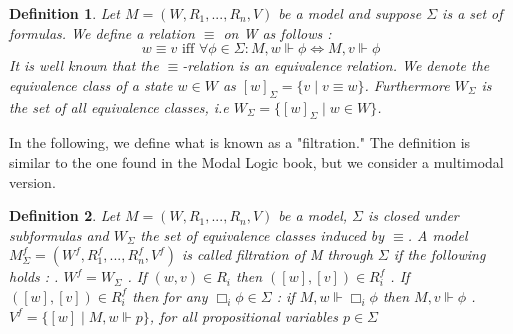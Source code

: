 \documentclass[12pt, a4paper]{scrartcl}
\newtheorem{definition}{Definition}[subsection]
\begin{document}
\begin{definition}
    Let $M = (W,R_1,...,R_n,V)$ be a model and suppose $\Sigma$ is a set of formulas. We define a relation $\equiv$ on W as follows : \newline 
    $$w \equiv v \mbox{ iff } \forall \phi \in \Sigma : M,w \Vdash \phi \Leftrightarrow M,v \Vdash \phi$$ 
    It is well known that the $\equiv$-relation is an equivalence relation. We denote the equivalence class of a state $w\in W$ as $[w]_\Sigma = \{v \mid v \equiv w\}$. Furthermore $W_\Sigma$ is the set of all equivalence classes, i.e
    $W_\Sigma = \{[w]_\Sigma \mid w \in W\}$.    
\end{definition}

In the following, we define what is known as a "filtration." The definition is similar to the one found in the Modal Logic book, but we consider a multimodal version.
\begin{definition}
    Let $M = (W,R_1,...,R_n,V)$ be a model, $\Sigma$ is closed under subformulas and $W_\Sigma$ the set of equivalence classes induced by $\equiv$.
    A model $M^f_\Sigma = (W^f, R_1^f,...,R_n^f, V^f)$ is called filtration of M through $\Sigma$ if the following holds : \newline {}. $W^f = W_\Sigma$ . If $(w,v) \in R_i$ then $([w],[v]) \in R^f_i$ . If $([w], [v]) \in R^f_i$ then for any $\Box_i \phi \in \Sigma$ : if $M,w \Vdash \Box_i \phi$ then $M,v \Vdash \phi$  . $V^f = \{[w] \mid M,w \Vdash p\}$, for all propositional variables $p \in \Sigma$      
\end{definition}
\end{document}
